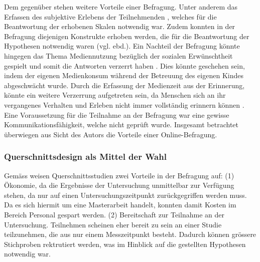 Dem gegenüber stehen weitere Vorteile einer Befragung. Unter anderem das Erfassen des subjektive Erlebens der Teilnehmenden \cite{Berk2005}, welches für die Beantwortung der erhobenen Skalen notwendig war. Zudem konnten in der Befragung diejenigen Konstrukte erhoben werden, die für die Beantwortung der Hypothesen notwendig waren (vgl. ebd.). Ein Nachteil der Befragung könnte hingegen das Thema Mediennutzung bezüglich der sozialen Erwünschtheit gespielt und somit die Antworten verzerrt haben \cite{Rey2012}. Dies könnte geschehen sein, indem der eigenen Medienkonsum während der Betreuung des eigenen Kindes abgeschwächt wurde. Durch die Erfassung der Medienzeit aus der Erinnerung, könnte ein weitere Verzerrung aufgetreten sein, da Menschen sich an ihr vergangenes Verhalten und Erleben nicht immer vollständig erinnern können \cite{Berk2005}. Eine Voraussetzung für die Teilnahme an der Befragung war eine gewisse Kommunikationsfähigkeit, welche nicht geprüft wurde. Insgesamt betrachtet überwiegen aus Sicht des Autors die Vorteile einer Online-Befragung. 

\subsubsection{Querschnittsdesign als Mittel der Wahl}
Gemäss  weisen Querschnittsstudien zwei Vorteile in der Befragung auf: (1) Ökonomie, da die Ergebnisse der Untersuchung unmittelbar zur Verfügung stehen, da nur auf einen Untersuchungszeitpunkt zurückgegriffen werden muss. Da es sich hiermit um eine Masterarbeit handelt, konnten damit Kosten im Bereich Personal gespart werden. (2) Bereitschaft zur Teilnahme an der Untersuchung. Teilnehmen scheinen eher bereit zu sein an einer Studie teilzunehmen, die aus nur einem Messzeitpunkt besteht. Dadurch können grössere Stichproben rektrutiert werden, was im Hinblick auf die gestellten Hypothesen notwendig war. 

